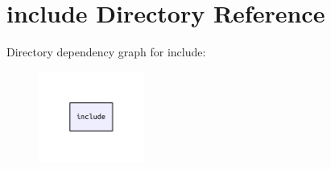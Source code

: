 \section{include Directory Reference}
\label{dir_d44c64559bbebec7f509842c48db8b23}
Directory dependency graph for include\+:
\nopagebreak
\begin{figure}[H]
\begin{center}
\leavevmode
\includegraphics[width=98pt]{dir_d44c64559bbebec7f509842c48db8b23_dep}
\end{center}
\end{figure}

